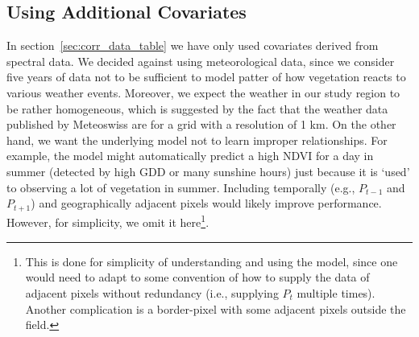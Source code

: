 {    \subsection{Using Additional Covariates}{
        In section~\ref{sec:corr_data_table} we have only used covariates derived from spectral data. 
        We decided against using meteorological data, since we consider five years of data not to be sufficient to model patter of how vegetation reacts to various weather events. Moreover, we expect the weather in our study region to be rather homogeneous, which is suggested by the fact that the weather data published by Meteoswiss are for a grid with a resolution of 1 km. On the other hand, we want the underlying model not to learn improper relationships. For example, the model might automatically predict a high NDVI for a day in summer (detected by high GDD or many sunshine hours) just because it is `used' to observing a lot of vegetation in summer. 
        Including temporally (e.g., $P_{t-1}$ and $P_{t+1}$) and geographically adjacent pixels would likely improve performance. However, for simplicity, we omit it here\footnote{This is done for simplicity of understanding and using the model, since one would need to adapt to some convention of how to supply the data of adjacent pixels without redundancy (i.e., supplying $P_t$ multiple times). Another complication is a border-pixel with some adjacent pixels outside the field.}.
    }
}

